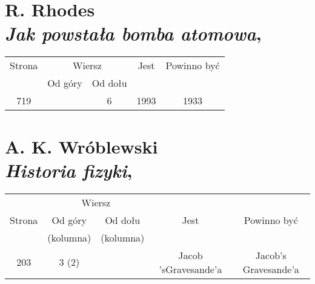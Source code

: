 \documentclass[a4paper,11pt]{article}
\numberwithin{equation}{section}
\begin{document}
\section{ %
  R. Rhodes \\
  \textit{Jak powstała bomba atomowa}, \cite{Rhodes00}}




\begin{center}

  \begin{tabular}{|c|c|c|c|c|}
    \hline
    Strona & \multicolumn{2}{c|}{Wiersz} & Jest
                              & Powinno być \\ \cline{2-3}
    & Od góry & Od dołu & & \\
    \hline
    719 & &  6 & 1993 & 1933 \\
    \hline
  \end{tabular}

\end{center}

\vspace{\spaceTwo}












\newpage

\section{ %
  A. K. Wróblewski \\
  \textit{Historia fizyki}, \cite{Wroblewski06}}




\begin{center}

  \begin{tabular}{|c|c|c|c|c|}
    \hline
    & \multicolumn{2}{c|}{Wiersz} & & \\ \cline{2-3}
    Strona & Od góry & Od dołu & Jest & Powinno być \\
    & (kolumna) & (kolumna) & & \\
    \hline
    203 & 3 (2) & & Jacob 'sGravesande'a & Jacob's Gravesande'a \\
    \hline
  \end{tabular}

\end{center}

\vspace{\spaceTwo}













\printbibliography





\end{document}
